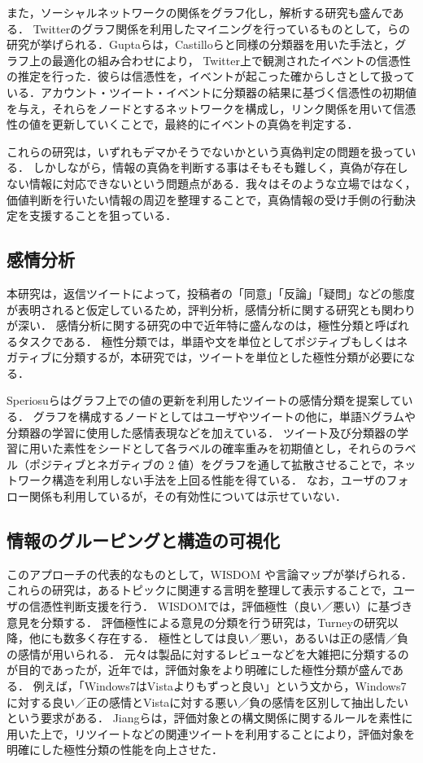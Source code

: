 \documentclass[japanese]{jnlp_1.4}
\newcommand{\addspan}[1]{}
\begin{document}
また，ソーシャルネットワークの関係をグラフ化し，解析する研究も盛んである．
Twitterのグラフ関係を利用したマイニングを行っているものとして，\addspan{Gupta}らの研究\cite{Gupta_2012}が挙げられる．Guptaらは，Castilloらと同様の分類器を用いた手法と，グラフ上の最適化の組み合わせにより，
Twitter上で観測されたイベントの信憑性の推定を行った．彼らは信憑性を，イベントが起こった確からしさとして扱っている．アカウント・ツイート・イベントに分類器の結果に基づく信憑性の初期値を与え，それらをノードとするネットワークを構成し，リンク関係を用いて信憑性の値を更新していくことで，最終的にイベントの真偽を判定する．

これらの研究は，いずれもデマかそうでないかという真偽判定の問題を扱っている．
しかしながら，情報の真偽を判断する事はそもそも難しく，真偽が存在しない情報に対応できないという問題点がある．我々はそのような立場ではなく，価値判断を行いたい情報の周辺を整理することで，真偽情報の受け手側の行動決定を支援することを狙っている．


\subsection{感情分析}

本研究は，返信ツイートによって，投稿者の「同意」「反論」「疑問」などの態度が表明されると仮定しているため，評判分析，感情分析に関する研究とも関わりが深い．
感情分析に関する研究の中で近年特に盛んなのは，極性分類と呼ばれるタスクである．
極性分類では，単語や文を単位としてポジティブもしくはネガティブに分類するが，本研究では，ツイートを単位とした極性分類が必要になる．

Speriosuら\cite{Speriosu_2011}はグラフ上での値の更新を利用したツイートの感情分類を提案している．
グラフを構成するノードとしてはユーザやツイートの他に，単語Nグラムや分類器の学習に使用した感情表現などを加えている．
ツイート及び分類器の学習に用いた素性をシードとして各ラベルの確率重みを初期値とし，それらのラベル（ポジティブとネガティブの 2 値）をグラフを通して拡散させることで，ネットワーク構造を利用しない手法を上回る性能を得ている．
なお，ユーザのフォロー関係も利用しているが，その有効性については示せていない．


\subsection{情報のグルーピングと構造の可視化}

このアプローチの代表的なものとして，WISDOM \cite{Akamine_2009}や言論マップ\cite{水野_2011}が挙げられる．
これらの研究は，あるトピックに関連する言明を整理して表示することで，ユーザの信憑性判断支援を行う．
WISDOMでは，評価極性（良い／悪い）に基づき意見を分類する．
評価極性による意見の分類を行う研究は，Turneyの研究\cite{Turney_2002}以降，他にも数多く存在する．
極性としては良い／悪い，あるいは正の感情／負の感情が用いられる．
元々は製品に対するレビューなどを大雑把に分類するのが目的であったが，近年では，評価対象をより明確にした極性分類が盛んである．
例えば，「Windows7はVistaよりもずっと良い」という文から，Windows7に対する良い／正の感情とVistaに対する悪い／負の感情を区別して抽出したいという要求がある．
Jiangらは，評価対象との構文関係に関するルールを素性に用いた上で，リツイートなどの関連ツイートを利用することにより，評価対象を明確にした極性分類の性能を向上させた\cite{Jiang_2011}．
\end{document}
